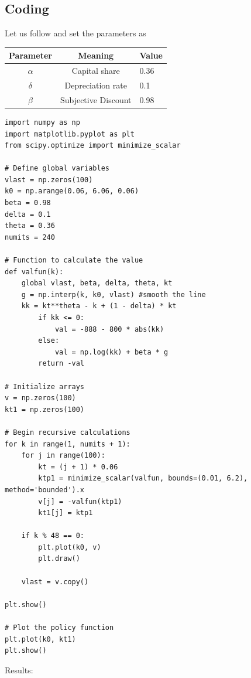 \documentclass[11pt,a4paper]{book}
\theoremstyle{definition}\newtheorem{definition}{Definition}
\theoremstyle{definition}\newtheorem{fact}{Fact}
\theoremstyle{definition}\newtheorem{remark}{Remark}
\theoremstyle{definition}\newtheorem{ex}{Ex.}
\theoremstyle{definition}\newtheorem{project}{Project}
\theoremstyle{definition}\newtheorem{problem}{Problem}
\theoremstyle{definition}\newtheorem{example}{Example}
\numberwithin{theorem}{section}
\numberwithin{corollary}{chapter}
\numberwithin{assumption}{chapter}
\numberwithin{definition}{chapter}
\numberwithin{prop}{chapter}
\numberwithin{notation}{chapter}
\numberwithin{problem}{chapter}
\numberwithin{example}{chapter}
\numberwithin{fact}{chapter}
\numberwithin{ex}{chapter}
\begin{document}
	\subsection{Coding}
	Let us follow \citet{mccandless2008abcs} and set the parameters as
	\begin{table}[ht]
		\centering
		\begin{tabular}{c  c  l}
			\toprule
			Parameter & Meaning & Value \\
			\midrule
			$\alpha$ & Capital share & 0.36 \\
			$\delta$ & Depreciation rate & 0.1 \\
			$\beta$ & Subjective Discount & 0.98 \\
			\bottomrule
		\end{tabular}
	\end{table}
	
\begin{verbatim}
import numpy as np
import matplotlib.pyplot as plt
from scipy.optimize import minimize_scalar
		
# Define global variables
vlast = np.zeros(100)
k0 = np.arange(0.06, 6.06, 0.06)
beta = 0.98
delta = 0.1
theta = 0.36
numits = 240
		
# Function to calculate the value
def valfun(k):
	global vlast, beta, delta, theta, kt
	g = np.interp(k, k0, vlast) #smooth the line
	kk = kt**theta - k + (1 - delta) * kt
		if kk <= 0:
			val = -888 - 800 * abs(kk)
		else:
			val = np.log(kk) + beta * g
		return -val
		
# Initialize arrays
v = np.zeros(100)
kt1 = np.zeros(100)
		
# Begin recursive calculations
for k in range(1, numits + 1):
	for j in range(100):
		kt = (j + 1) * 0.06
		ktp1 = minimize_scalar(valfun, bounds=(0.01, 6.2), method='bounded').x
		v[j] = -valfun(ktp1)
		kt1[j] = ktp1
		
	if k % 48 == 0:
		plt.plot(k0, v)
		plt.draw()
		
	vlast = v.copy()
		
plt.show()
		
# Plot the policy function
plt.plot(k0, kt1)
plt.show()
	\end{verbatim}

Results:
\end{document}
